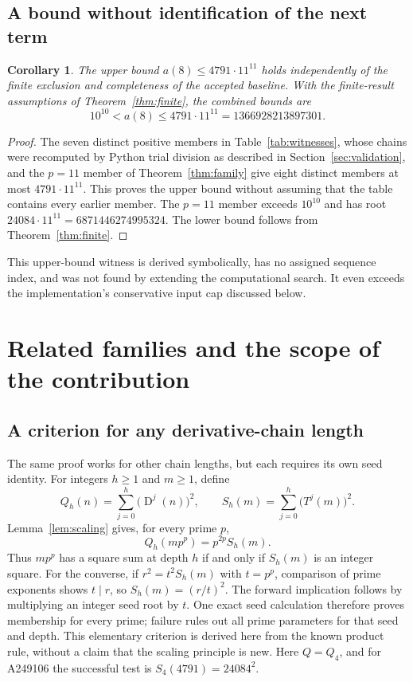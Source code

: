 \documentclass[11pt,a4paper]{article}
\newtheorem{corollary}[theorem]{Corollary}
\theoremstyle{remark}
\newcommand{\D}{\operatorname{D}}
\begin{document}
\subsection{A bound without identification of the next term}
\begin{corollary}\label{cor:eighth}
The upper bound $a(8)\le4791\cdot11^{11}$ holds independently of the
finite exclusion and completeness of the accepted baseline. With the
finite-result assumptions of Theorem~\ref{thm:finite}, the combined bounds are
\begin{equation}\label{eq:eighth}
10^{10}<a(8)\le4791\cdot11^{11}=1366928213897301.
\end{equation}
\end{corollary}
\begin{proof}
The seven distinct positive members in Table~\ref{tab:witnesses}, whose
chains were recomputed by Python trial division as described in
Section~\ref{sec:validation}, and the
$p=11$ member of Theorem~\ref{thm:family} give eight distinct members
at most $4791\cdot11^{11}$. This proves the upper bound without assuming
that the table contains every earlier member. The $p=11$ member exceeds
$10^{10}$ and has root $24084\cdot11^{11}=6871446274995324$.
The lower bound follows from Theorem~\ref{thm:finite}.
\end{proof}
This upper-bound witness is derived symbolically, has no assigned sequence
index, and was not found by extending the computational search. It even
exceeds the implementation's conservative input cap discussed below.

\section{Related families and the scope of the contribution}\label{sec:related}
\subsection{A criterion for any derivative-chain length}
The same proof works for other chain lengths, but each requires its own
seed identity. For integers $h\ge1$ and $m\ge1$, define
\[
 Q_h(n)=\sum_{j=0}^h\bigl(\D^j(n)\bigr)^2,\qquad
 S_h(m)=\sum_{j=0}^h\bigl(T^j(m)\bigr)^2.
\]
Lemma~\ref{lem:scaling} gives, for every prime $p$,
\begin{equation}\label{eq:general-seed}
 Q_h(mp^p)=p^{2p}S_h(m).
\end{equation}
Thus $mp^p$ has a square sum at depth $h$ if and only if $S_h(m)$
is an integer square. For the converse, if $r^2=t^2S_h(m)$ with
$t=p^p$, comparison of prime exponents shows $t\mid r$, so
$S_h(m)=(r/t)^2$. The forward implication follows by multiplying
an integer seed root by $t$. One exact seed calculation therefore proves
membership for every prime; failure rules out all prime parameters for
that seed and depth. This elementary criterion is derived here from the
known product rule, without a claim that the scaling principle is new.
Here $Q=Q_4$, and for A249106 the successful test is $S_4(4791)=24084^2$.
\end{document}
